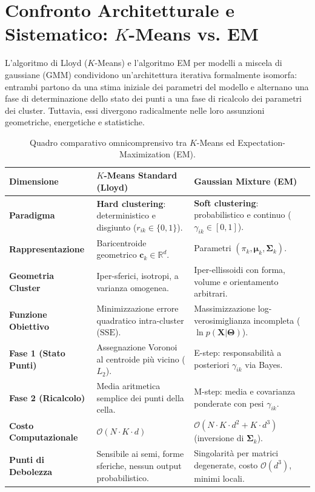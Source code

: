 \section{Confronto Architetturale e Sistematico: \texorpdfstring{$K$}{K}-Means vs. EM}
\label{sec:dm-kmeans-em-comparison}

L'algoritmo di Lloyd ($K$-Means) e l'algoritmo EM per modelli a miscela di gaussiane (GMM) condividono un'architettura iterativa formalmente isomorfa: entrambi partono da una stima iniziale dei parametri del modello e alternano una fase di determinazione dello stato dei punti a una fase di ricalcolo dei parametri dei cluster. Tuttavia, essi divergono radicalmente nelle loro assunzioni geometriche, energetiche e statistiche.

\begin{table}[H]
    \centering
    \small
    \renewcommand{\arraystretch}{1.3}
    \begin{tabularx}{\textwidth}{>{\raggedright\arraybackslash\bfseries}p{3.3cm} Y Y}
        \toprule
        \textbf{Dimensione} & \textbf{$K$-Means Standard (Lloyd)} & \textbf{Gaussian Mixture (EM)} \\
        \midrule
        Paradigma & \textbf{Hard clustering}: deterministico e disgiunto ($r_{ik} \in \{0, 1\}$). & \textbf{Soft clustering}: probabilistico e continuo ($\gamma_{ik} \in [0, 1]$). \\
        \addlinespace[3pt]
        Rappresentazione & Baricentroide geometrico $\mathbf{c}_k \in \mathbb{R}^d$. & Parametri $(\pi_k, \boldsymbol{\mu}_k, \boldsymbol{\Sigma}_k)$. \\
        \addlinespace[3pt]
        Geometria Cluster & Iper-sferici, isotropi, a varianza omogenea. & Iper-ellissoidi con forma, volume e orientamento arbitrari. \\
        \addlinespace[3pt]
        Funzione Obiettivo & Minimizzazione errore quadratico intra-cluster ($\mathrm{SSE}$). & Massimizzazione log-verosimiglianza incompleta ($\ln p(\mathbf{X}|\boldsymbol{\Theta})$). \\
        \addlinespace[3pt]
        Fase 1 (Stato Punti) & Assegnazione Voronoi al centroide più vicino ($L_2$). & E-step: responsabilità a posteriori $\gamma_{ik}$ via Bayes. \\
        \addlinespace[3pt]
        Fase 2 (Ricalcolo) & Media aritmetica semplice dei punti della cella. & M-step: media e covarianza ponderate con pesi $\gamma_{ik}$. \\
        \addlinespace[3pt]
        Costo Computazionale & $\mathcal{O}(N \cdot K \cdot d)$ & $\mathcal{O}(N \cdot K \cdot d^2 + K \cdot d^3)$ (inversione di $\boldsymbol{\Sigma}_k$). \\
        \addlinespace[3pt]
        Punti di Debolezza & Sensibile ai semi, forme sferiche, nessun output probabilistico. & Singolarità per matrici degenerate, costo $\mathcal{O}(d^3)$, minimi locali. \\
        \bottomrule
    \end{tabularx}
    \caption{Quadro comparativo omnicomprensivo tra $K$-Means ed Expectation-Maximization (EM).}
    \label{tab:dm-kmeans-em-detailed-comparison}
\end{table}


